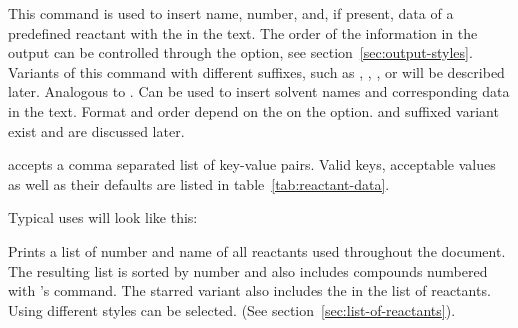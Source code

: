 \documentclass{chemmacros-manual}
\begin{document}
\begin{commands}
  This command is used to insert name, number, and, if present, data of a predefined 
  reactant with the  in the text. The order of the information in the output 
  can be controlled through the   option, see 
  section~\vref{sec:output-styles}.  Variants of this command with different suffixes, such 
  as \code{*}, \code{+}, ,  or  will be described later.
  Analogous to . Can be used to insert solvent names and corresponding 
  data in the text. Format and order depend on the on the  option.  
  and  suffixed variant exist and are discussed later.
\end{commands}

 accepts a comma separated list of key-value pairs. Valid keys,
acceptable values as well as their defaults are listed in table~\vref{tab:reactant-data}.

Typical uses will look like this:
\begin{sourcecode}
\end{sourcecode}

\begin{commands}
   Prints a list of number and name of all reactants used
   throughout the document. The resulting list is sorted by number and also includes
   compounds numbered with 's  command. The starred variant 
   also includes the  in the list of reactants. Using  
   different styles can be selected. (See section~\vref{sec:list-of-reactants}).
\end{commands}
\end{document}

